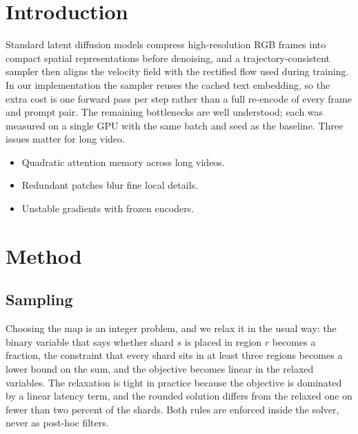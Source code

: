 \documentclass[10pt,twocolumn,letterpaper]{article}
\begin{document}

\section{Introduction}

Standard latent diffusion models compress high-resolution RGB frames into compact spatial
representations before denoising, and a trajectory-consistent sampler then aligns the
velocity field with the rectified flow used during training. In our implementation the
sampler reuses the cached text embedding, so the extra cost is one forward pass per step
rather than a full re-encode of every frame and prompt pair. The remaining bottlenecks are well understood; each was measured on a single GPU with
the same batch and seed as the baseline. Three issues matter for long video.

\begin{itemize}
\item Quadratic attention memory across long videos.
\item Redundant patches blur fine local details.
\item Unstable gradients with frozen encoders.
\end{itemize}

\section{Method}

\subsection{Sampling}
\noindent Choosing the map is an integer problem, and we relax it in the usual way: the
binary variable that says whether shard $s$ is placed in region $r$ becomes a fraction,
the constraint that every shard sits in at least three regions becomes a lower bound on
the sum, and the objective becomes linear in the relaxed variables. The relaxation is
tight in practice because the objective is dominated by a linear latency term, and the
rounded solution differs from the relaxed one on fewer than two percent of the shards.
Both rules are enforced inside the solver, never as post-hoc filters.
\end{document}
